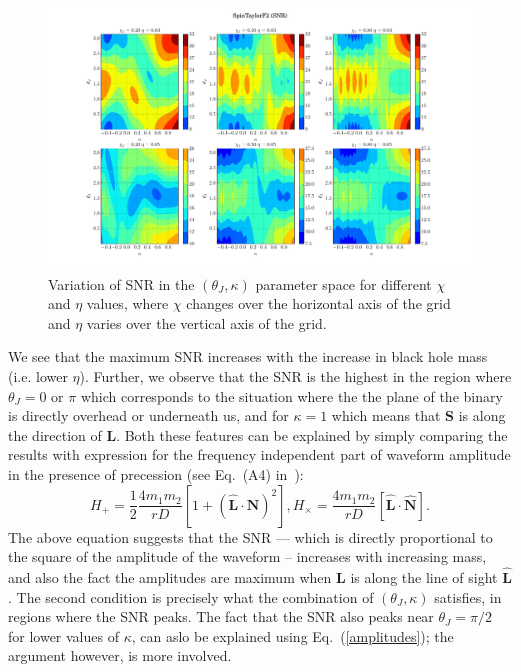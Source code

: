 \label{fig:SNR} 
\begin{figure}[t]
\includegraphics[width=\textwidth]{./images/SNR_GRID_0F.pdf}
\caption{Variation of SNR in the $(\theta_J, \kappa)$ parameter space for 
different $\chi$ and $\eta$ values, where $\chi$ changes over the horizontal 
axis of the grid and $\eta$ varies over the vertical axis of the grid.}
\centering 
\end{figure}

We see that the maximum SNR increases with the increase in black hole mass
(i.e. lower $\eta$). Further, we observe that the SNR is the highest in the
region where  $\theta_{J} = 0$ or $\pi$ which corresponds to the situation where
the the plane of  the binary is directly overhead or underneath us, and for
$\kappa = 1$ which means that  $\mathbf{S}$ is along the direction of
$\mathbf{L}$. Both these features can be explained by simply comparing the
results with expression for the frequency independent part of waveform amplitude 
in the presence of precession (see Eq.~(A4) in~\cite{Apostolatos1994}):
\label{amplitudes}
\begin{equation}
H_{+} = \frac{1}{2}\frac{4 m_{1}m_{2}}{rD} \left[1 + (\hat{\mathbf{L}}\cdot\hat{\mathbf{N}})^{2}\right], 
H_{\times} = \frac{4 m_{1}m_{2}}{rD}\left[\hat{\mathbf{L}}\cdot\hat{\mathbf{N}}\right].
\end{equation}
The above equation suggests that the SNR --- which is directly proportional to
the square of the  amplitude of the waveform -- increases with increasing mass,
and also the fact the amplitudes  are maximum when $\mathbf{L}$ is along the
line of sight $\hat{\mathbf{L}}$. The second condition is precisely what the
combination of $(\theta_J, \kappa)$ satisfies, in regions where the SNR peaks.
The fact that the SNR also peaks near $\theta_J = \pi/2$ for lower values of
$\kappa$, can aslo be explained using Eq.~(\ref{amplitudes}); the argument
however, is more involved.

